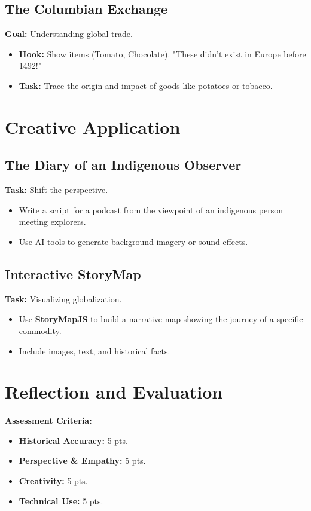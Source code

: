 \documentclass[11pt, a4paper]{article}
\begin{document}
\subsection{The Columbian Exchange}
\textbf{Goal:} Understanding global trade.
\begin{itemize}
    \item \textbf{Hook:} Show items (Tomato, Chocolate). "These didn't exist in Europe before 1492!"
    \item \textbf{Task:} Trace the origin and impact of goods like potatoes or tobacco.
\end{itemize}

\section{Creative Application}
\subsection{The Diary of an Indigenous Observer}
\textbf{Task:} Shift the perspective.
\begin{itemize}
    \item Write a script for a podcast from the viewpoint of an indigenous person meeting explorers.
    \item Use AI tools to generate background imagery or sound effects.
\end{itemize}

\subsection{Interactive StoryMap}
\textbf{Task:} Visualizing globalization.
\begin{itemize}
    \item Use \textbf{StoryMapJS} to build a narrative map showing the journey of a specific commodity.
    \item Include images, text, and historical facts.
\end{itemize}

\section{Reflection and Evaluation}
\textbf{Assessment Criteria:}
\begin{itemize}
    \item \textbf{Historical Accuracy:} 5 pts.
    \item \textbf{Perspective \& Empathy:} 5 pts.
    \item \textbf{Creativity:} 5 pts.
    \item \textbf{Technical Use:} 5 pts.
\end{itemize}
\end{document}
